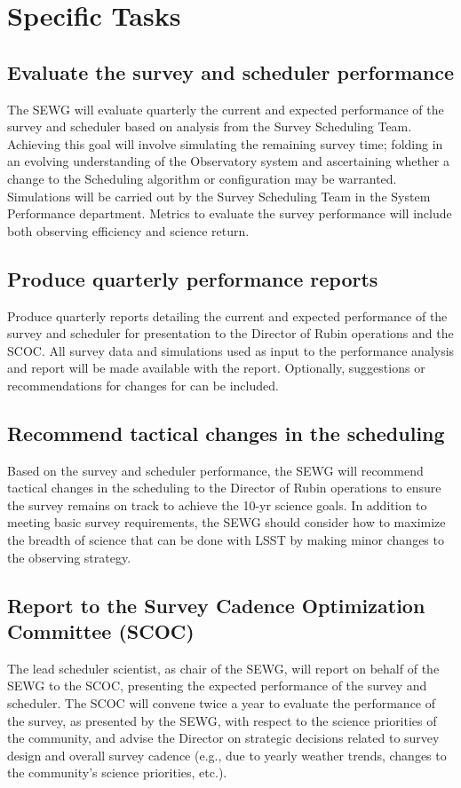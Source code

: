 \documentclass[OPS,authoryear,toc]{lsstdoc}
\begin{document}
 
\section{Specific Tasks}

\subsection{Evaluate the survey and scheduler performance}
The SEWG will evaluate quarterly the current and expected performance of the survey and scheduler based on analysis from the Survey Scheduling Team.
Achieving this goal will involve simulating the remaining survey time; folding in an evolving understanding of the Observatory system and ascertaining whether a change to the Scheduling algorithm or configuration may be warranted. 
Simulations will be carried out by the Survey Scheduling Team in the System Performance department. 
Metrics to evaluate the survey performance will include both observing efficiency and science return. 

\subsection{Produce quarterly performance reports}
Produce quarterly reports detailing the current and expected performance of the survey and scheduler for presentation to the Director of Rubin operations and the SCOC. 
All survey data and simulations used as input to the performance analysis and report will be made available with the report. 
Optionally, suggestions or recommendations for changes for can be included. 

\subsection{Recommend tactical changes in the scheduling}
Based on the  survey and scheduler performance, the SEWG will recommend tactical changes in the scheduling to the Director of Rubin operations to ensure the survey remains on track to achieve the 10-yr science goals.
In addition to meeting basic survey requirements, the SEWG should consider how to maximize the breadth of science that can be done with LSST by making minor changes to the observing strategy. 

\subsection{Report to the Survey Cadence Optimization Committee (SCOC)}
The lead scheduler scientist, as chair of the SEWG, will report on behalf of the SEWG to the SCOC, presenting the expected performance of the survey and scheduler.
The SCOC will convene twice a year to evaluate the performance of the survey, as presented by the SEWG, with respect to the science priorities of the community, and advise the Director on strategic decisions related to survey design and overall survey cadence (e.g., due to  yearly weather trends, changes to the community's science priorities, etc.).
\end{document}
